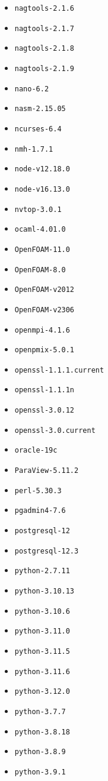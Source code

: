\begin{itemize}
\item \verb|nagtools-2.1.6|
\item \verb|nagtools-2.1.7|
\item \verb|nagtools-2.1.8|
\item \verb|nagtools-2.1.9|
\item \verb|nano-6.2|
\item \verb|nasm-2.15.05|
\item \verb|ncurses-6.4|
\item \verb|nmh-1.7.1|
\item \verb|node-v12.18.0|
\item \verb|node-v16.13.0|
\item \verb|nvtop-3.0.1|
\item \verb|ocaml-4.01.0|
\item \verb|OpenFOAM-11.0|
\item \verb|OpenFOAM-8.0|
\item \verb|OpenFOAM-v2012|
\item \verb|OpenFOAM-v2306|
\item \verb|openmpi-4.1.6|
\item \verb|openpmix-5.0.1|
\item \verb|openssl-1.1.1.current|
\item \verb|openssl-1.1.1n|
\item \verb|openssl-3.0.12|
\item \verb|openssl-3.0.current|
\item \verb|oracle-19c|
\item \verb|ParaView-5.11.2|
\item \verb|perl-5.30.3|
\item \verb|pgadmin4-7.6|
\item \verb|postgresql-12|
\item \verb|postgresql-12.3|
\item \verb|python-2.7.11|
\item \verb|python-3.10.13|
\item \verb|python-3.10.6|
\item \verb|python-3.11.0|
\item \verb|python-3.11.5|
\item \verb|python-3.11.6|
\item \verb|python-3.12.0|
\item \verb|python-3.7.7|
\item \verb|python-3.8.18|
\item \verb|python-3.8.9|
\item \verb|python-3.9.1|

\end{itemize}
